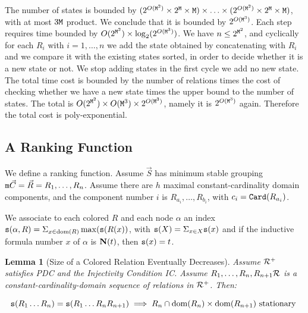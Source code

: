\documentclass{lmcs}
\newtheorem{lemma}[theorem]{Lemma}
\begin{document}
The number of states is bounded by 
$
(2^{O({\tt M}^2)} \times 2^{\tt M} \times {\tt M})
\times \ldots \times
(2^{O({\tt M}^2)} \times 2^{\tt M} \times {\tt M})
$,
with at most $3{\tt M}$ product. 
We conclude that it is bounded by $2^{O({\tt M}^3)}$. Each step requires time bounded by
$O(2^{{\tt M}^2}) \times \log_2(2^{O({\tt M}^3)})$. 
We have $n \le 2^{{\tt M}^2}$, and cyclically 
for each $R_i$ with $i = 1, \ldots, n$ we add the state obtained by concatenating with 
$R_i$ and we compare it with the existing states sorted, in order to decide whether it is a new
state or not. We stop adding states in the first cycle we add no new state.
The total time cost is bounded by the number of relations times the cost of checking
whether we have a new state times the upper bound to the number of states.
The total is $O(2^{{\tt M}^2}) \times {O({\tt M}^3)} \times 2^{O({\tt M}^3)}$,
namely it is $2^{O({\tt M}^3)}$ again. Therefore the total cost is poly-exponential.


\subsection{A Ranking Function}
We define a ranking function. Assume $\vec{S}$ has minimum stable grouping 
${\tt m}{\vec{C}} = \vec{R} = R_1, \ldots, R_n$. Assume there are $h$ maximal
constant-cardinality domain components, and the component number $i$ is  
$R_{a_i}, \ldots ,R_{b_i}$, with $c_i  = {\tt Card}(R_{a_i})$.  

We associate to each colored $R$ and each node $\alpha$ an index ${\tt s}(\alpha, R) =
\Sigma_{x \in {\rm dom}(R)} \max({\tt s}(R(x))$, with ${\tt s}(X)=\Sigma_{x \in X} {\tt s}(x)$
and if the inductive formula number $x$ of $\alpha$ is ${\bf N}(t)$, then ${\tt s}(x) =t$.

\begin{lemma}[Size of a Colored Relation Eventually Decreases]
\label{lemma-size-colored-relation}
Assume ${\mathcal R}^+$ satisfies PDC and the Injectivity Condition IC. 
Assume $R_1, \ldots, R_n, R_{n+1} {\mathcal R}$ is a constant-cardinality-domain sequence of 
relations in ${\mathcal R}^+$. Then:

$$
{\tt s}(R_1 \ldots R_n) = {\tt s}(R_1 \ldots R_n R_{n+1})
\implies
R_n \cap {\rm dom}(R_{n}) \times {\rm dom}(R_{n+1}) \mbox{ stationary }
$$
\end{lemma}
\end{document}
